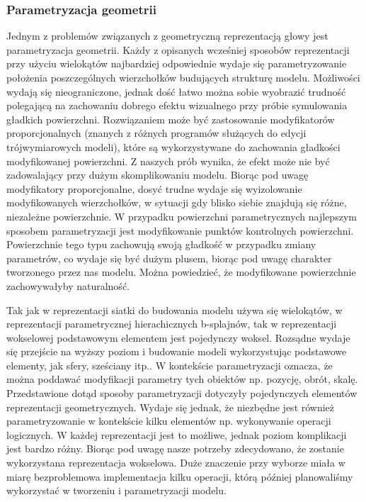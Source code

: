 \subsubsection{Parametryzacja geometrii}
Jednym z problemów związanych z geometryczną reprezentacją głowy jest
parametryzacja geometrii. Każdy z opisanych wcześniej sposobów reprezentacji
przy użyciu wielokątów najbardziej odpowiednie wydaje się
parametryzowanie położenia poszczególnych wierzchołków budujących strukturę
modelu. Możliwości wydają się nieograniczone, jednak dość łatwo można sobie
wyobrazić trudność polegającą na zachowaniu dobrego efektu wizualnego przy
próbie symulowania gładkich powierzchni. Rozwiązaniem może być zastosowanie
modyfikatorów proporcjonalnych (znanych z różnych programów służących do edycji
trójwymiarowych modeli), które są wykorzystywane do zachowania gładkości
modyfikowanej powierzchni. Z naszych prób wynika, że efekt może nie być
zadowalający przy dużym skomplikowaniu modelu. Biorąc pod uwagę modyfikatory proporcjonalne, dosyć trudne wydaje się wyizolowanie modyfikowanych wierzchołków, w sytuacji gdy blisko siebie znajdują się różne, niezależne powierzchnie. W przypadku powierzchni parametrycznych najlepszym sposobem parametryzacji jest
modyfikowanie punktów kontrolnych powierzchni. Powierzchnie tego typu zachowują swoją gładkość w przypadku zmiany parametrów,
co wydaje się być dużym plusem, biorąc pod uwagę charakter tworzonego przez nas
modelu. Można powiedzieć, że modyfikowane powierzchnie zachowywałyby
naturalność.

Tak jak w reprezentacji siatki do budowania modelu używa się wielokątów,
w reprezentacji parametrycznej hierachicznych b-splajnów, tak w reprezentacji
wokselowej podstawowym elementem jest pojedynczy woksel. Rozsądne wydaje się
przejście na wyższy poziom i budowanie modeli wykorzystując podstawowe
elementy, jak sfery, sześciany itp.. W kontekście parametryzacji oznacza,
że można poddawać modyfikacji parametry tych obiektów np. pozycję,
obrót, skalę. Przedstawione dotąd sposoby parametryzacji dotyczyły pojedynczych
elementów reprezentacji geometrycznych. Wydaje się jednak, że niezbędne jest również parametryzowanie w kontekście kilku elementów np. wykonywanie operacji logicznych. W każdej
reprezentacji jest to możliwe, jednak poziom komplikacji jest bardzo różny.
Biorąc pod uwagę nasze potrzeby zdecydowano, że zostanie wykorzystana
reprezentacja wokselowa. Duże znaczenie przy wyborze miała w miarę
bezproblemowa implementacja kilku operacji, którą później planowaliśmy
wykorzystać w tworzeniu i parametryzacji modelu.


